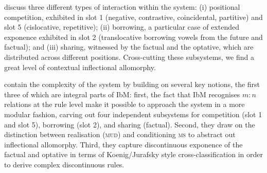 \documentclass[output=paper,biblatex,babelshorthands,newtxmath,draftmode,colorlinks,citecolor=brown]{langscibook}
\begin{document}
\begin{exe}
\begin{xlist}
\begin{exe}
\begin{xlist}
\begin{table}
  \centering
{}
  \caption{Position classes of Oneida inflectional prefixes
    \citep[435]{diaz:koenig:michelson:19}}
  \label{tab:Oneida}
\end{table}

\citet{diaz:koenig:michelson:19} discuss three different types of
interaction within the system: (i) positional competition, exhibited
in slot 1 (negative, contrastive, coincidental, partitive) and slot 5
(cislocative, repetitive); (ii) borrowing, a particular case of
extended exponence exhibited in slot 2 (translocative borrowing vowels
from the future and factual); and (iii) sharing, witnessed by the
factual and the optative, which are distributed across different
positions. Cross-cutting these subsystems, we find a great level of
contextual inflectional allomorphy.

\citet{diaz:koenig:michelson:19} contain the complexity of the system
by building on several key notions, the first three of which are
integral parts of IbM: first, the fact that IbM recognises $m:n$
relations at the rule level make it possible to approach the
 system in a more modular fashion, carving out four
independent subsystems for competition (slot 1 and slot 5), borrowing
(slot 2), and sharing (factual). Second, they draw on the distinction
between realisation (\textsc{mud}) and conditioning \textsc{ms} to
abstract out inflectional allomorphy. Third, they capture
discontinuous exponence of the factual and optative in terms of
Koenig/Jurafsky style cross-classification in order to derive complex
discontinuous rules.


\end{xlist}
\end{exe}
\end{xlist}
\end{exe}
\end{document}

